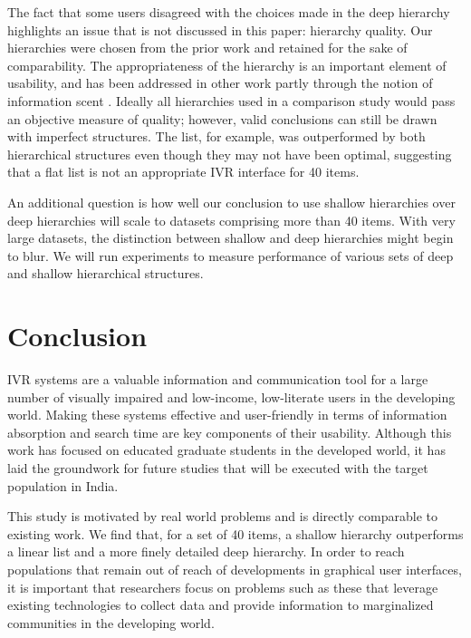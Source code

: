 \documentclass{sigchi}
\begin{document}
The fact that some users disagreed with the choices made in the deep hierarchy highlights an issue that is not discussed in this paper: hierarchy quality. Our hierarchies were chosen from the prior work \cite{Medhi2013a,Medhi2013b} and retained for the sake of comparability. The appropriateness of the hierarchy is an important element of usability, and has been addressed in other work partly through the notion of information scent \cite{Pirolli2003}. Ideally all hierarchies used in a comparison study would pass an objective measure of quality; however, valid conclusions can still be drawn with imperfect structures. The list, for example, was outperformed by both hierarchical structures even though they may not have been optimal, suggesting that a flat list is not an appropriate IVR interface for 40 items.

An additional question is how well our conclusion to use shallow hierarchies over deep hierarchies will scale to datasets comprising more than 40 items. With very large datasets, the distinction between shallow and deep hierarchies might begin to blur. We will run experiments to measure performance of various sets of deep and shallow hierarchical structures.

\section{Conclusion}

IVR systems are a valuable information and communication tool for a large number of visually impaired and low-income, low-literate users in the developing world. Making these systems effective and user-friendly in terms of information absorption and search time are key components of their usability. Although this work has focused on educated graduate students in the developed world, it has laid the groundwork for future studies that will be executed with the target population in India.

This study is motivated by real world problems and is directly comparable to existing work. We find that, for a set of 40 items, a shallow hierarchy outperforms a linear list and a more finely detailed deep hierarchy. In order to reach populations that remain out of reach of developments in graphical user interfaces, it is important that researchers focus on problems such as these that leverage existing technologies to collect data and provide information to marginalized communities in the developing world. 
\end{document}
